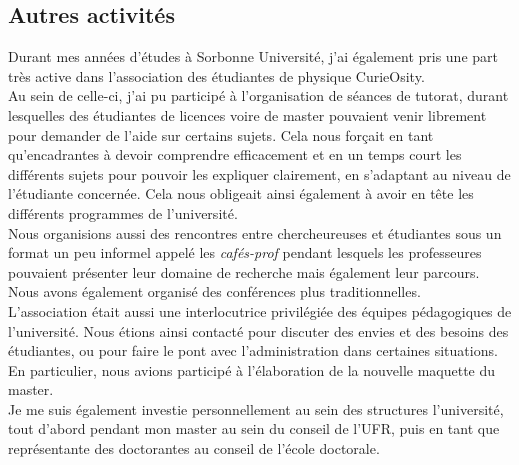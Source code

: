 \documentclass[a4paper,11pt]{article} %
\newcommand{\pointmedian}{\fontfamily{cmr}\selectfont\textperiodcentered}
\begin{document}
	\subsection{Autres activités}
	Durant mes années d'études à Sorbonne Université, j'ai également pris une part très active dans l'association des étudiant\pointmedian es de physique CurieOsity.\\ 
	Au sein de celle-ci, j'ai pu participé à l'organisation de séances de tutorat, durant lesquelles des étudiant\pointmedian es de licences voire de master pouvaient venir librement pour demander de l'aide sur certains sujets. Cela nous forçait en tant qu'encadrant\pointmedian es à devoir comprendre efficacement et en un temps court les différents sujets pour pouvoir les expliquer clairement, en s'adaptant au niveau de l'étudiant\pointmedian e concerné\pointmedian e. Cela nous obligeait ainsi également à avoir en tête les différents programmes de l'université.\\
	Nous organisions aussi des rencontres entre chercheur\pointmedian euses et étudiant\pointmedian es sous un format un peu informel appelé les \textit{cafés-prof} pendant lesquels les professeur\pointmedian es pouvaient présenter leur domaine de recherche mais également leur parcours. Nous avons également organisé des conférences plus traditionnelles.\\
	L'association était aussi une interlocutrice privilégiée des équipes pédagogiques de l'université. Nous étions ainsi contacté pour discuter des envies et des besoins des étudiant\pointmedian es, ou pour faire le pont avec l'administration dans certaines situations. En particulier, nous avions participé à l'élaboration de la nouvelle maquette du master.\\
	
	Je me suis également investie personnellement au sein des structures l'université, tout d'abord pendant mon master au sein du conseil de l'UFR, puis en tant que représentante des doctorant\pointmedian es au conseil de l'école doctorale.
	
	
\end{document}
